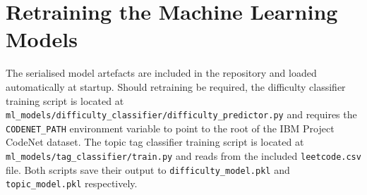 \section*{Retraining the Machine Learning Models}

The serialised model artefacts are included in the repository and
loaded automatically at startup. Should retraining be required, the
difficulty classifier training script is located at
\texttt{ml\_models/difficulty\_classifier/difficulty\_predictor.py}
and requires the \texttt{CODENET\_PATH} environment variable to point
to the root of the IBM Project CodeNet dataset. The topic tag
classifier training script is located at
\texttt{ml\_models/tag\_classifier/train.py} and reads from the
included \texttt{leetcode.csv} file. Both scripts save their output
to \texttt{difficulty\_model.pkl} and \texttt{topic\_model.pkl}
respectively.